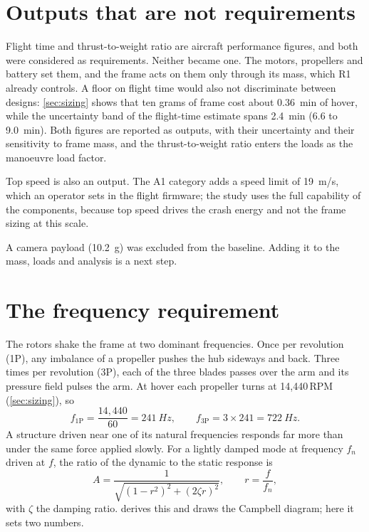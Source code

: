 \section{Outputs that are not requirements}\label{sec:req-outputs}

Flight time and thrust-to-weight ratio are aircraft performance figures, and both were considered as requirements. Neither became one. The motors, propellers and battery set them, and the frame acts on them only through its mass, which R1 already controls. A floor on flight time would also not discriminate between designs: \cref{sec:sizing} shows that ten grams of frame cost about \SI{0.36}{min} of hover, while the uncertainty band of the flight-time estimate spans \SI{2.4}{min} (6.6 to \SI{9.0}{min}). Both figures are reported as outputs, with their uncertainty and their sensitivity to frame mass, and the thrust-to-weight ratio enters the loads as the manoeuvre load factor.

Top speed is also an output. The A1 category adds a speed limit of \SI{19}{m/s}, which an operator sets in the flight firmware; the study uses the full capability of the components, because top speed drives the crash energy and not the frame sizing at this scale.

A camera payload (\SI{10.2}{g}) was excluded from the baseline. Adding it to the mass, loads and analysis is a next step.

\section{The frequency requirement}\label{sec:req-frequency}

The rotors shake the frame at two dominant frequencies. Once per revolution (1P), any imbalance of a propeller pushes the hub sideways and back. Three times per revolution (3P), each of the three blades passes over the arm and its pressure field pulses the arm. At hover each propeller turns at 14,440\,RPM (\cref{sec:sizing}), so
\begin{equation}
f_\text{1P} = \frac{14{,}440}{60} = \SI{241}{Hz}, \qquad f_\text{3P} = 3 \times 241 = \SI{722}{Hz}.
\end{equation}
A structure driven near one of its natural frequencies responds far more than under the same force applied slowly. For a lightly damped mode at frequency $f_n$ driven at $f$, the ratio of the dynamic to the static response is
\begin{equation}
A = \frac{1}{\sqrt{\left(1 - r^2\right)^2 + \left(2\zeta r\right)^2}}, \qquad r = \frac{f}{f_n},
\end{equation}
with $\zeta$ the damping ratio.  derives this and draws the Campbell diagram; here it sets two numbers.

